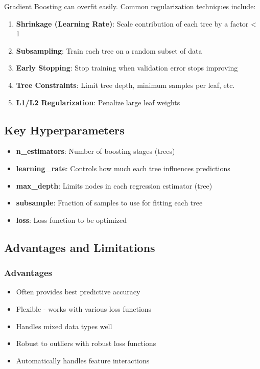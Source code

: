 \documentclass[
  letterpaper,
  DIV=11,
  numbers=noendperiod]{scrreprt}
\providecommand{\tightlist}{%
  \setlength{\itemsep}{0pt}\setlength{\parskip}{0pt}}\usepackage{longtable,booktabs,array}
\begin{document}
Gradient Boosting can overfit easily. Common regularization techniques
include:

\begin{enumerate}
\def\labelenumi{\arabic{enumi}.}
\tightlist
\item
  \textbf{Shrinkage (Learning Rate)}: Scale contribution of each tree by
  a factor \textless{} 1
\item
  \textbf{Subsampling}: Train each tree on a random subset of data
\item
  \textbf{Early Stopping}: Stop training when validation error stops
  improving
\item
  \textbf{Tree Constraints}: Limit tree depth, minimum samples per leaf,
  etc.
\item
  \textbf{L1/L2 Regularization}: Penalize large leaf weights
\end{enumerate}

\subsection{Key Hyperparameters}\label{key-hyperparameters}

\begin{itemize}
\tightlist
\item
  \textbf{n\_estimators}: Number of boosting stages (trees)
\item
  \textbf{learning\_rate}: Controls how much each tree influences
  predictions
\item
  \textbf{max\_depth}: Limits nodes in each regression estimator (tree)
\item
  \textbf{subsample}: Fraction of samples to use for fitting each tree
\item
  \textbf{loss}: Loss function to be optimized
\end{itemize}

\subsection{Advantages and
Limitations}\label{advantages-and-limitations-2}

\subsubsection{Advantages}\label{advantages-4}

\begin{itemize}
\tightlist
\item
  Often provides best predictive accuracy
\item
  Flexible - works with various loss functions
\item
  Handles mixed data types well
\item
  Robust to outliers with robust loss functions
\item
  Automatically handles feature interactions
\end{itemize}
\end{document}
